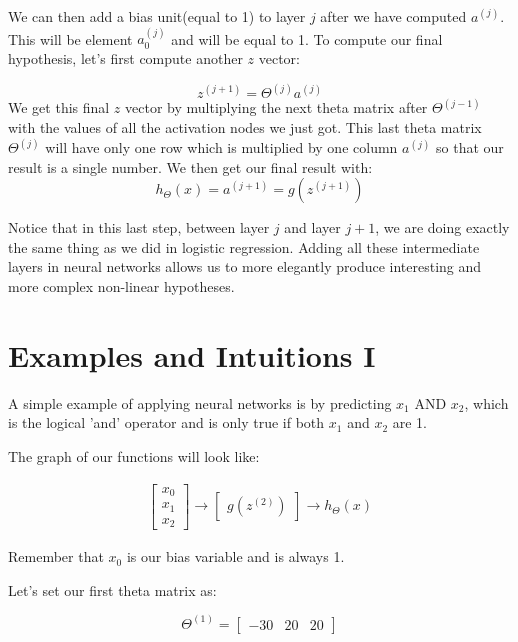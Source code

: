 \documentclass[10pt,a4paper,UTF8]{article}
\begin{document}
We can then add a bias unit(equal to 1) to layer \(j\) after we have computed \(a^{(j)}\). This will be element \(a_{0}^{(j)}\) and will be equal to 1. To compute our final hypothesis, let's first compute another \(z\) vector:

\begin{equation}
\label{eq:7}
z^{(j+1)} = \Theta^{(j)}a^{(j)}
\end{equation}
We get this final \(z\) vector by multiplying the next theta matrix after \(\Theta^{(j-1)}\) with the values of all the activation nodes we just got. This last theta matrix \(\Theta^{(j)}\) will have only one row which is multiplied by one column \(a^{(j)}\) so that our result is a single number. We then get our final result with:
\begin{equation}
\label{eq:6}
h_\Theta(x) = a^{(j+1)} = g(z^{(j+1)})
\end{equation}

Notice that in this last step, between layer \(j\) and layer \(j+1\), we are doing exactly the same thing as we did in logistic regression. Adding all these intermediate layers in neural networks allows us to more elegantly produce interesting and more complex non-linear hypotheses.
\section{Examples and Intuitions I}
\label{sec:orgf0f34c0}


A simple example of applying neural networks is by predicting \(x_{1}\) AND \(x_{2}\), which is the logical 'and' operator and is only true if both \(x_{1}\) and \(x_{2}\) are 1.

The graph of our functions will look like:

\begin{align*}\begin{bmatrix}x_0 \\ x_1 \\ x_2\end{bmatrix} \rightarrow\begin{bmatrix}g(z^{(2)})\end{bmatrix} \rightarrow h_\Theta(x)\end{align*}

Remember that \(x_{0}\) is our bias variable and is always 1.

Let's set our first theta matrix as:

\begin{equation}
\label{eq:9}
\Theta^{(1)} =\begin{bmatrix}-30 & 20 & 20\end{bmatrix}
\end{equation}
\end{document}
